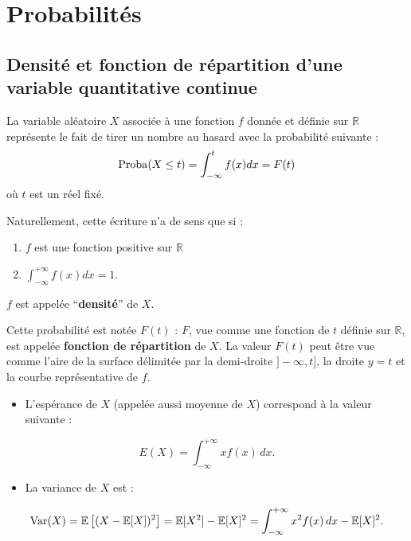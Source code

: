 \documentclass[]{book}
\providecommand{\tightlist}{%
  \setlength{\itemsep}{0pt}\setlength{\parskip}{0pt}}
\theoremstyle{definition}
\theoremstyle{definition}
\theoremstyle{remark}
\begin{document}
\chapter{Probabilités}\label{probabilites}

\section{Densité et fonction de répartition d'une variable quantitative
continue}\label{densite-et-fonction-de-repartition-dune-variable-quantitative-continue}

La variable aléatoire \(X\) associée à une fonction \(f\) donnée et
définie sur \(\mathbb{R}\) représente le fait de tirer un nombre au
hasard avec la probabilité suivante
:\[{\rm Proba}(X\leq t)=\int_{-\infty}^{t} f(x) dx = F(t)\] où \(t\) est
un réel fixé.

Naturellement, cette écriture n'a de sens que si :

\begin{enumerate}
\def\labelenumi{\arabic{enumi}.}
\item
  \(f\) est une fonction positive sur \(\mathbb{R}\)
\item
  \(\displaystyle\int_{-\infty}^{+\infty} f(x) dx=1\).
\end{enumerate}

\(f\) est appelée ``\textbf{densité}'' de \(X\).

Cette probabilité est notée \(F(t)\) : \(F\), vue comme une fonction de
\(t\) définie sur \(\mathbb{R}\), est appelée \textbf{fonction de
répartition} de \(X\). La valeur \(F(t)\) peut être vue comme l'aire de
la surface délimitée par la demi-droite \(]-\infty,t]\), la droite
\(y=t\) et la courbe représentative de \(f\).

\begin{itemize}
\tightlist
\item
  L'espérance de \(X\) (appelée aussi moyenne de \(X\)) correspond à la
  valeur suivante :
\end{itemize}

\[E(X)=\int_{-\infty}^{+\infty} xf(x)\,dx.\]

\begin{itemize}
\tightlist
\item
  La variance de \(X\) est :
\end{itemize}

\[{\rm Var}(X)=\mathbb E\left[ (X-\mathbb E[X])^2 \right]  = \mathbb E[X^2] - \mathbb E[X]^2 =  \int_{-\infty}^{+\infty}x^2f(x)\,dx-\mathbb E[X]^2.\]
\end{document}
